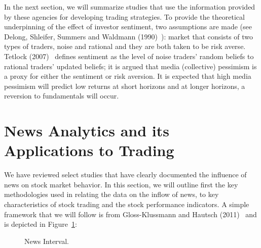 In the next section, we will summarize studies that use the information provided by these agencies for developing trading strategies. To provide the theoretical underpinning of the effect of investor sentiment, two assumptions are made (see Delong, Shleifer, Summers and Waldmann (1990)~\cite{ssw}): market that consists of two types of traders, noise and rational and they are both taken to be risk averse. Tetlock (2007)~\cite{tetlock2007giving} defines sentiment as the level of noise traders' random beliefs to rational traders' updated beliefs; it is argued that media (collective) pessimism is a proxy for either the sentiment or risk aversion. It is expected that high media pessimism will predict low returns at short horizons and at longer horizons, a reversion to fundamentals will occur. 



\section{News Analytics and its Applications to Trading}

We have reviewed select studies that have clearly documented the influence of news on stock market behavior. In this section, we will outline first the key methodologies used in relating the data on the inflow of news, to key characteristics of stock trading and the stock performance indicators. A simple framework that we will follow is from Gloss-Klussmann and Hautsch (2011)~\cite{klub} and is depicted in Figure~\ref{fig:intervals}:
	
	\begin{figure}[!ht]
	\centering
	\caption{News Interval.\label{fig:intervals}}
	\end{figure}

